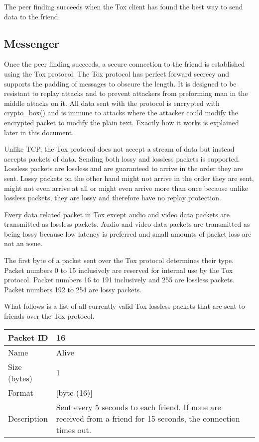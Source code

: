 \documentclass{tox}
\begin{document}
The peer finding succeeds when the Tox client has found the best way to send 
data to the friend.

\subsection{Messenger}

Once the peer finding succeeds, a secure connection to the friend is 
established using the Tox protocol. The Tox protocol has perfect forward 
secrecy and supports the padding of messages to obscure the length. It is 
designed to be resistant to replay attacks and to prevent attackers from 
preforming man in the middle attacks on it. All data sent with the protocol 
is encrypted with crypto\_box() and is immune to attacks where the attacker 
could modify the encrypted packet to modify the plain text. Exactly how it 
works is explained later in this document.

Unlike TCP, the Tox protocol does not accept a stream of data but instead 
accepts packets of data. Sending both lossy and lossless packets is supported. 
Lossless packets are lossless and are guaranteed to arrive in the order they 
are sent. Lossy packets on the other hand might not arrive in the order they 
are sent, might not even arrive at all or might even arrive more than once 
because unlike lossless packets, they are lossy and therefore have no replay 
protection.

Every data related packet in Tox except audio and video data packets are 
transmitted as lossless packets. Audio and video data packets are transmitted 
as being lossy because low latency is preferred and small amounts of packet 
loss are not an issue.

The first byte of a packet sent over the Tox protocol determines their type. 
Packet numbers 0 to 15 inclusively are reserved for internal use by the Tox 
protocol. Packet numbers 16 to 191 inclusively and 255 are lossless packets. 
Packet numbers 192 to 254 are lossy packets.

What follows is a list of all currently valid Tox lossless packets that are 
sent to friends over the Tox protocol.


\begin{tabular}[pos]{|l|p{9cm}|}

\hline
Packet ID       &      16
\\ \hline
Name            &      Alive
\\ \hline
Size (bytes)    &      1
\\ \hline
Format          &      [byte (16)]
\\ \hline
Description     &      Sent every 5 seconds to each friend. If none are 
                       received from a friend for 15 seconds, the connection 
                       times out.
\\ \hline

\end{tabular}
\end{document}
